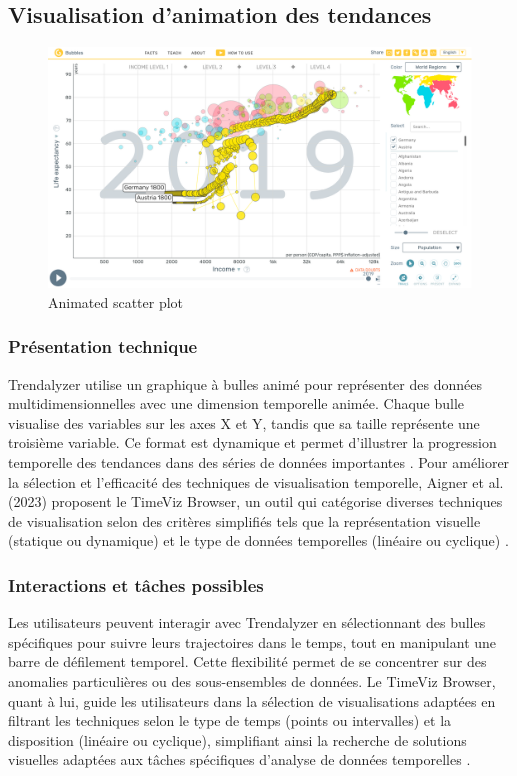 \documentclass[runningheads]{llncs}
\begin{document}
\subsection{Visualisation d'animation des tendances}
\begin{figure}
    \centering
    \includegraphics[width=1\linewidth]{assets/animated-scatter-plot.png}
    \caption{Animated scatter plot \cite{robertson_effectiveness_2008}}
    \label{fig:enter-label}
\end{figure}
\subsubsection{Présentation technique}  
Trendalyzer utilise un graphique à bulles animé pour représenter des données multidimensionnelles avec une dimension temporelle animée. Chaque bulle visualise des variables sur les axes X et Y, tandis que sa taille représente une troisième variable. Ce format est dynamique et permet d’illustrer la progression temporelle des tendances dans des séries de données importantes \cite{robertson_effectiveness_2008}. Pour améliorer la sélection et l'efficacité des techniques de visualisation temporelle, Aigner et al. (2023) proposent le TimeViz Browser, un outil qui catégorise diverses techniques de visualisation selon des critères simplifiés tels que la représentation visuelle (statique ou dynamique) et le type de données temporelles (linéaire ou cyclique) \cite{aigner_visualization_2023}.

\subsubsection{Interactions et tâches possibles}  
Les utilisateurs peuvent interagir avec Trendalyzer en sélectionnant des bulles spécifiques pour suivre leurs trajectoires dans le temps, tout en manipulant une barre de défilement temporel. Cette flexibilité permet de se concentrer sur des anomalies particulières ou des sous-ensembles de données. Le TimeViz Browser, quant à lui, guide les utilisateurs dans la sélection de visualisations adaptées en filtrant les techniques selon le type de temps (points ou intervalles) et la disposition (linéaire ou cyclique), simplifiant ainsi la recherche de solutions visuelles adaptées aux tâches spécifiques d’analyse de données temporelles \cite{aigner_visualization_2023}.
\end{document}
